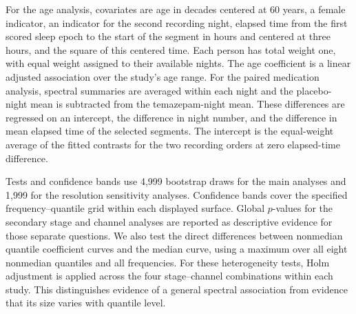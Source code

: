 For the age analysis, covariates are age in decades centered at 60 years, a female indicator, an indicator for the second recording night, elapsed time from the first scored sleep epoch to the start of the segment in hours and centered at three hours, and the square of this centered time. Each person has total weight one, with equal weight assigned to their available nights. The age coefficient is a linear adjusted association over the study's age range. For the paired medication analysis, spectral summaries are averaged within each night and the placebo-night mean is subtracted from the temazepam-night mean. These differences are regressed on an intercept, the difference in night number, and the difference in mean elapsed time of the selected segments. The intercept is the equal-weight average of the fitted contrasts for the two recording orders at zero elapsed-time difference.

Tests and confidence bands use 4,999 bootstrap draws for the main analyses and 1,999 for the resolution sensitivity analyses. Confidence bands cover the specified frequency--quantile grid within each displayed surface. Global $p$-values for the secondary stage and channel analyses are reported as descriptive evidence for those separate questions. We also test the direct differences between nonmedian quantile coefficient curves and the median curve, using a maximum over all eight nonmedian quantiles and all frequencies. For these heterogeneity tests, Holm adjustment is applied across the four stage--channel combinations within each study. This distinguishes evidence of a general spectral association from evidence that its size varies with quantile level.
